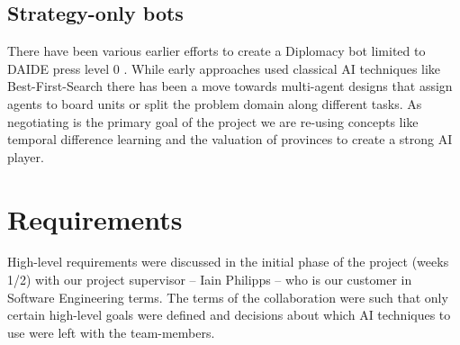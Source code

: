 \documentclass[pdftex,12pt,a4paper]{report}
\begin{document}
\subsection{Strategy-only bots}

There have been various earlier efforts to create a Diplomacy bot
limited to DAIDE press level 0 \cite{DAIDEsyntax10}. While early
approaches used classical AI techniques like Best-First-Search there
has been a move towards multi-agent designs that assign agents to
board units or split the problem domain along different tasks. As
negotiating is the primary goal of the project we are re-using
concepts like temporal difference learning \cite{Levinson94} and the
valuation of provinces \cite{Huff05} to create a strong AI player.


\pagebreak

\section{Requirements}
High-level requirements were discussed in the initial phase of the
project (weeks 1/2) with our project supervisor -- Iain Philipps --
who is our customer in Software Engineering terms. The terms of the
collaboration were such that only certain high-level goals were
defined and decisions about which AI techniques to use were left with
the team-members.
\end{document}
